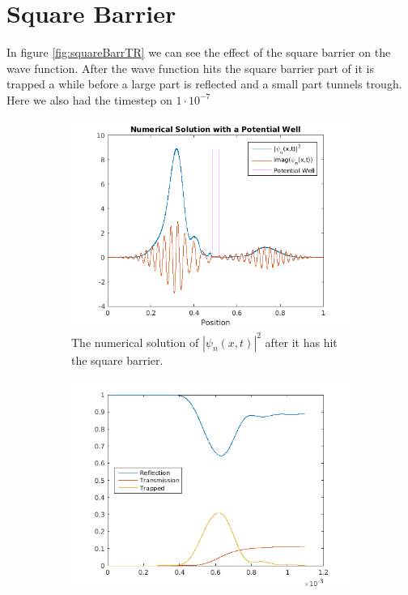 \documentclass[11pt]{article}
\newlength\figureheight
\newlength\figurewidth
\begin{document}
\section{Square Barrier}
In figure \ref{fig:squareBarrTR} we can see the effect of the square barrier on the wave function. After the wave function hits the square barrier part of it is trapped a while before a large part is reflected and a small part tunnels trough. Here we also had the timestep on $1\cdot10^{-7}$

\begin{figure}[H]
	\centering
	\begin{subfigure}{.9\linewidth}
		\includegraphics[width=1\textwidth]{../src/plots/squareBarrPlot.png}
		\caption{The numerical solution of $|\psi_n(x,t)|^2$ after it has hit the square barrier.}
		\label{fig:squareBarrfPlot}
	\end{subfigure}
	\begin{subfigure}{.9\linewidth}
		\setlength{} 
		\setlength{}
		\includegraphics[width=1\textwidth]{../src/plots/squareBarrTR.png}

\end{subfigure}
\end{figure}
\end{document}
